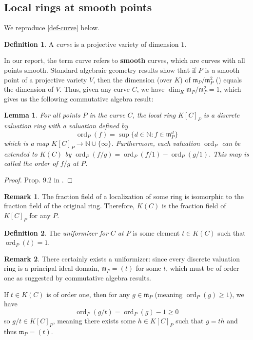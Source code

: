 \documentclass[12pt]{article}
\newtheorem{lemma}{Lemma}[subsection]
\theoremstyle{remark}
\theoremstyle{definition}
\newtheorem{remark}{Remark}[subsection]
\newtheorem{definition}{Definition}[subsection]
\newcommand{\ord}[0]{\operatorname{ord}}
\newcommand{\N}[0]{\mathbb{N}}
\begin{document}
        \subsection{Local rings at smooth points}
            We reproduce \autoref{def-curve} below.
            \begin{definition}
                A \textit{curve} is a projective variety of dimension $1$.
            \end{definition}
            In our report, the term curve refers to \textbf{smooth} curves, which are curves with all points smooth. Standard algebraic geometry results show that if $P$ is a smooth point of a projective variety $V$, then the dimension (over $K$) of $\mathfrak m_P/\mathfrak m_P^2$ (\cite{hartshorne_2010_algebraic}) equals the dimension of $V$. Thus, given any curve $C$, we have $\dim_K \mathfrak m_P/\mathfrak m_P^2=1$, which gives us the following commutative algebra result:
            \begin{lemma}\label{lemma-ord}
                For all points $P$ in the curve $C$, the local ring $K[C]_P$ is a discrete valuation ring with a valuation defined by
                \[\ord_P(f)=\sup\{d\in\N:f\in\mathfrak m_P^d\}\]
                which is a map $K[C]_P\to\N\cup\{\infty\}$. Furthermore, each valuation $\ord_P$ can be extended to $K(C)$ by $\ord_P(f/g)=\ord_P(f/1)-\ord_P(g/1)$. This map is called \textup{the order of $f/g$ at $P$}.
            \end{lemma}
            \begin{proof}
                Prop. 9.2 in \cite{atiyah1994introduction}.
            \end{proof}
            \begin{remark}
                The fraction field of a localization of some ring is isomorphic to the fraction field of the original ring. Therefore, $K(C)$ is the fraction field of $K[C]_P$ for any $P$.
            \end{remark}
            \begin{definition}
                The \textit{uniformizer for $C$ at $P$} is some element $t\in K(C)$ such that $\ord_P(t)=1$.
            \end{definition}
            \begin{remark}\label{remark-unif-exist}
                There certainly exists a uniformizer: since every discrete valuation ring is a principal ideal domain, $\mathfrak m_P=(t)$ for some $t$, which must be of order one as suggested by commutative algebra results.
    
                If $t\in K(C)$ is of order one, then for any $g\in\mathfrak m_P$ (meaning $\ord_P(g)\geqslant 1$), we have
                \[\ord_P(g/t)=\ord_P (g)-1\geqslant 0\]
                so $g/t\in K[C]_P$, meaning there exists some $h\in K[C]_P$ such that $g=th$ and thus $\mathfrak m_P=(t)$.
            \end{remark}
\end{document}
